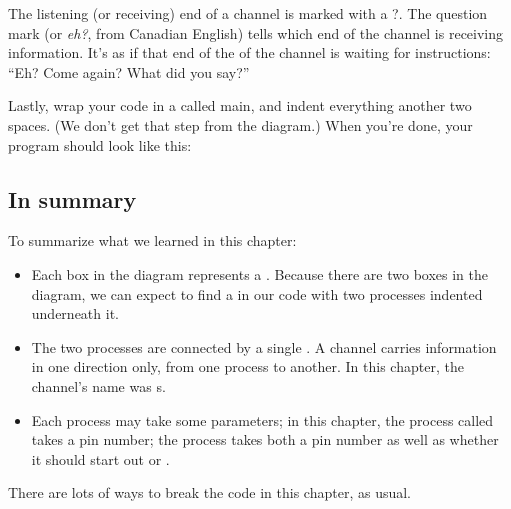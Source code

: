 \vspace{3mm}
The listening (or {\strong receiving}) end of a channel is marked with a {\code ?}. The question mark (or {\em eh?}, from Canadian English) tells \occam which end of the channel is receiving information. It's as if that end of the of the channel is waiting for instructions: ``Eh? Come again? What did you say?''

\clearpage
\newpage

Lastly, wrap your code in a \PROCedure called {\code main}, and indent everything another two spaces. (We don't get that step from the diagram.) When you're done, your program should look like this:

\vspace{3mm}


\subsection{In summary}

To summarize what we learned in this chapter:


\begin{itemize}
	\item Each box in the diagram represents a \PROCedure. Because there are two boxes in the diagram, we can expect to find a \PAR in our code with two processes indented underneath it. 
	\item The two processes are connected by a single \CHANnel. A channel carries information in one direction only, from one process to another. In this chapter, the channel's name was {\code s}.
	\item Each process may take some parameters; in this chapter, the process called \bp takes a pin number; the process \tp takes both a pin number as well as whether it should start out \LOW or \HIGH.
\end{itemize}


\BREAKAGE
There are lots of ways to break the code in this chapter, as usual.

